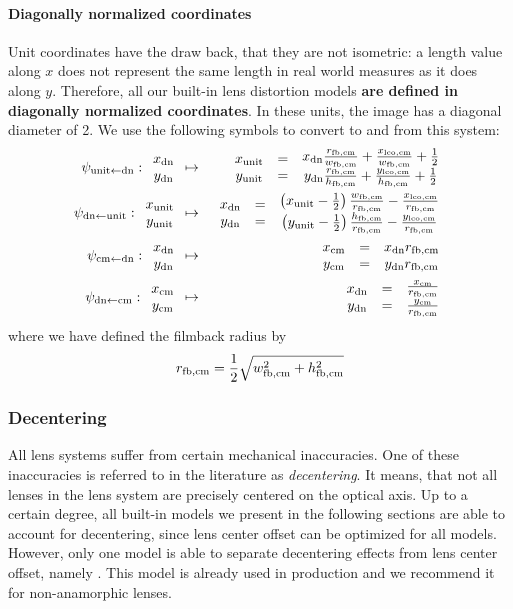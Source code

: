 \documentclass[10pt,a4paper]{article}
\newcommand{\beq}{\begin{equation}}
\newcommand{\eeq}{\end{equation}}
\newcommand{\bea}{\begin{eqnarray}}
\newcommand{\eea}{\end{eqnarray}}
\newcommand{\vectwonopar}[2]{\begin{array}{c}#1\\#2\end{array}}
\begin{document}
\paragraph{Diagonally normalized coordinates}
\label{DiagonallyNormalizedCoordinates}
Unit coordinates have the draw back, that they are not isometric:
a length value along $x$ does not represent the same length in real world
measures as it does along $y$. Therefore, all our built-in lens distortion
models {\bf are defined in diagonally normalized coordinates}. In these units,
the image has a diagonal diameter of 2. We use the following symbols to convert
to and from this system:
\bea
\dntounit : \vectwonopar{\xdn}{\ydn} & \mapsto & \vectwonopar{\xunit}{\yunit} \vectwonopar== \vectwonopar{\xdn \frac \rfbcm \wfbcm +\frac \xlcocm \wfbcm + \frac 1 2}{\ydn \frac \rfbcm \hfbcm +\frac \ylcocm \hfbcm + \frac 1 2} \label{eq:DefinitionDnToUnit} \\
\unittodn : \vectwonopar{\xunit}{\yunit} & \mapsto & \vectwonopar{\xdn}{\ydn} \vectwonopar== \vectwonopar{\left(\xunit - \frac 1 2\right) \frac \wfbcm \rfbcm - \frac \xlcocm \rfbcm}{\left(\yunit - \frac 1 2\right) \frac \hfbcm \rfbcm - \frac \ylcocm \rfbcm} \label{eq:DefinitionUnitToDn} \nonumber\\
\dntocm   : \vectwonopar{\xdn}{\ydn} & \mapsto & \vectwonopar{\xcm}{\ycm} \vectwonopar== \vectwonopar{\xdn \rfbcm}{\ydn \rfbcm} \label{eq:DefinitionDnToCm} \\
\cmtodn   : \vectwonopar{\xcm}{\ycm} & \mapsto & \vectwonopar{\xdn}{\ydn} \vectwonopar== \vectwonopar{\frac \xcm \rfbcm}{\frac \ycm \rfbcm} \label{eq:DefinitionCmToDn}
\eea
where we have defined the filmback radius by
\beq
\rfbcm = \frac 1 2 \sqrt{\wfbcm^2+\hfbcm^2}
\eeq
%
\subsubsection{Decentering}
All lens systems suffer from certain mechanical inaccuracies.
One of these inaccuracies is referred to in the literature as {\em decentering}.
It means, that not all lenses in the lens system are precisely centered on the optical axis.
Up to a certain degree, all built-in models we present in the following sections
are able to account for decentering, since lens center offset can be optimized for all models.
However, only one model is able to separate decentering effects from lens center offset, namely
. This model is already used in production
and we recommend it for non-anamorphic lenses.
\end{document}
